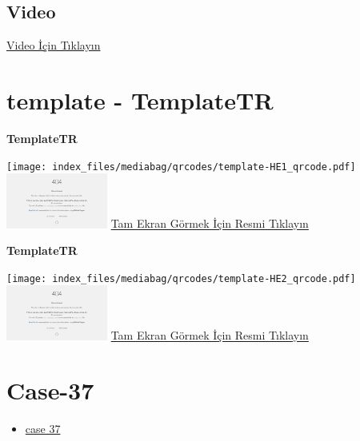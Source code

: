 \documentclass[
  letterpaper,
  DIV=11,
  numbers=noendperiod]{scrreprt}
\providecommand{\tightlist}{%
  \setlength{\itemsep}{0pt}\setlength{\parskip}{0pt}}\usepackage{longtable,booktabs,array}
\begin{document}
\hypertarget{video-35}{%
\subsection{Video}\label{video-35}}

\href{https://www.youtube.com/watch?v=ga7KjbH3U1s}{Video İçin Tıklayın}

\hypertarget{sec-template}{%
\section{template - TemplateTR}\label{sec-template}}

\textbf{TemplateTR}

\texttt{[image: index\_files/mediabag/qrcodes/template-HE1\_qrcode.pdf]}
\href{https://images.patolojiatlasi.com/template/HE1.html}{\includegraphics[width=0.25\textwidth,height=\textheight]{./screenshots/thumbnail_template-HE1.png}}
\href{https://images.patolojiatlasi.com/template/HE1.html}{Tam Ekran
Görmek İçin Resmi Tıklayın}

\textbf{TemplateTR}

\texttt{[image: index\_files/mediabag/qrcodes/template-HE2\_qrcode.pdf]}
\href{https://images.patolojiatlasi.com/template/HE2.html}{\includegraphics[width=0.25\textwidth,height=\textheight]{./screenshots/thumbnail_template-HE2.png}}
\href{https://images.patolojiatlasi.com/template/HE2.html}{Tam Ekran
Görmek İçin Resmi Tıklayın}

\hypertarget{sec-hacettepe-case-of-the-month-case-37}{%
\section{Case-37}\label{sec-hacettepe-case-of-the-month-case-37}}

\begin{itemize}
\tightlist
\item
  \href{https://www.youtube.com/watch?v=H8cnZqL29eI&ab_channel=KemalKosemehmetoglu}{case
  37}
\end{itemize}
\end{document}
